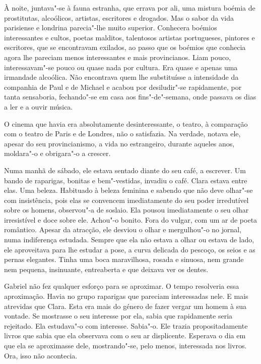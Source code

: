 À noite, juntava"-se à fauna estranha, que errava por ali, uma mistura
boémia de prostitutas, alcoólicos, artistas, escritores e drogados. Mas
o sabor da vida parisiense e londrina parecia"-lhe muito superior.
Conhecera boémios interessantes e cultos, poetas malditos, talentosos
artistas portugueses, pintores e escritores, que se encontravam
exilados, ao passo que os boémios que conhecia agora lhe pareciam menos
interessantes e mais provincianos. Liam pouco, interessavam"-se pouco ou
quase nada por cultura. Era quase e apenas uma irmandade alcoólica. Não
encontrava quem lhe substituísse a intensidade da companhia de Paul e de
Michael e acabou por desiludir"-se rapidamente, por tanta sensaboria,
fechando"-se em casa aos fins"-de"-semana, onde passava os dias a ler e a
ouvir música.

O cinema que havia era absolutamente desinteressante, o teatro, à
comparação com o teatro de Paris e de Londres, não o satisfazia. Na
verdade, notava ele, apesar do seu provincianismo, a vida no
estrangeiro, durante aqueles anos, moldara"-o e obrigara"-o a crescer.

Numa manhã de sábado, ele estava sentado diante do seu café, a escrever.
Um bando de raparigas, bonitas e bem"-vestidas, invadiu o café. Clara
estava entre elas. Uma beleza. Habituado à beleza feminina e sabendo que
não deve olhar"-se com insistência, pois elas se convencem imediatamente
do seu poder irredutível sobre os homens, observou"-a de soslaio. Ela
pousou imediatamente o seu olhar irresistível e doce sobre ele. Achou"-o
bonito. Fora do vulgar, com um ar de poeta romântico. Apesar da
atracção, ele desviou o olhar e mergulhou"-o no jornal, numa indiferença
estudada. Sempre que ela não estava a olhar ou estava de lado, ele
aproveitava para lhe estudar a pose, a curva delicada do pescoço, os
seios e as pernas elegantes. Tinha uma boca maravilhosa, rosada e
sinuosa, nem grande nem pequena, insinuante, entreaberta e que deixava
ver os dentes.

Gabriel não fez qualquer esforço para se aproximar. O tempo resolveria
essa aproximação. Havia no grupo raparigas que pareciam interessadas
nele. E mais atrevidas que Clara. Esta era mais do género de fazer
vergar um homem à sua vontade. Se mostrasse o seu interesse por ela,
sabia que rapidamente seria rejeitado. Ela estudava"-o com interesse.
Sabia"-o. Ele trazia propositadamente livros que sabia que ela observava
com o seu ar displicente. Esperava o dia em que ela se aproximasse dele,
mostrando"-se, pelo menos, interessada nos livros. Ora, isso não
acontecia.

